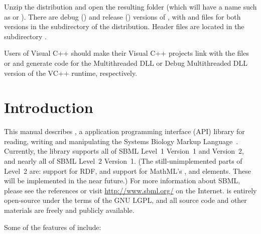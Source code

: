 \documentclass{sbmlmanual}
\begin{document}
Unzip the \libsbml{} distribution and open the resulting folder (which will
have a name such as  or
).  There are debug () and
release () versions of \libsbml{}, with  and
 files for both versions in the  subdirectory of
the \libsbml{} distribution.  Header files are located in the subdirectory
.

Users of Visual C++ should make their Visual C++ projects link with the
files  or  and generate code for the
Multithreaded DLL or Debug Multithreaded DLL version of the VC++ runtime,
respectively.


\section{Introduction}
\label{sec:introduction}

This manual describes \libsbml{}, a application programming interface (API)
library for reading, writing and manipulating the Systems Biology Markup
Language~\citep[SBML;][]{hucka_2001b,hucka_2003,finney_2003b}.  Currently,
the library supports all of SBML Level~1 Version~1 and Version~2, and
nearly all of SBML Level~2 Version~1.  (The still-unimplemented parts of
Level~2 are: support for RDF, and support for MathML's ,
 and  elements.  These will be
implemented in the near future.)  For more information about SBML, please
see the references or visit \url{http://www.sbml.org/} on the Internet.
\libsbml{} is entirely open-source under the terms of the GNU LGPL, and all
source code and other materials are freely and publicly available.

Some of the features of \libsbml{} include:
\end{document}
